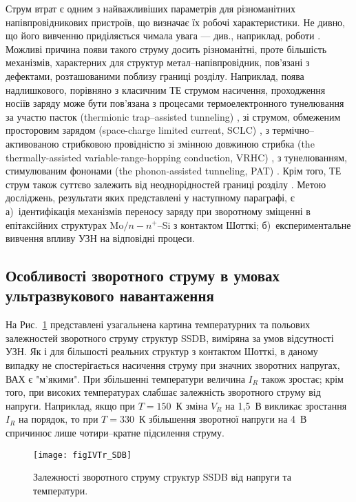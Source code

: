 Струм втрат є одним з найважливіших параметрів для різноманітних напівпровідникових пристроїв, що визначає їх робочі характеристики.
Не дивно, що його вивченню приділяється чимала увага --- див., наприклад, роботи \cite{Sathaiya,VRH:Shan,Pipinys2006,Referi1,Referi2}.
Можливі причина появи такого струму досить різноманітні, проте більшість механізмів, характерних для структур метал--напівпровідник,
пов'язані з дефектами, розташованими поблизу границі розділу.
Наприклад, поява надлишкового, порівняно з класичним ТЕ струмом насичення, проходження носіїв заряду може
бути пов'язана
з процесами термоелектронного тунелювання за участю пасток (thermionic trap--assisted tunneling) \cite{Sathaiya},
зі струмом, обмеженим просторовим зарядом (space-charge limited current, SCLC) \cite{Abu-Samaha,Jafar},
з термічно--активованою стрибковою провідністю зі змінною довжиною стрибка (the thermally-assisted variable-range-hopping conduction, VRHC) \cite{Jafar,VRH:Lee,VRH:Shan},
з тунелюванням, стимулюваним фононами (the phonon-assisted tunneling, PAT) \cite{Pipinys1999,Pipinys2006}.
Крім того, ТЕ струм також суттєво залежить від неоднорідностей границі розділу  \cite{Tung:MSE}.
Метою досліджень, результати яких представлені у наступному параграфі, є
а)~ідентифікація механізмів переносу заряду при зворотному зміщенні в епітаксійних структурах Mo$/n-n^+$--Si з контактом Шотткі;
б)~експериментальне вивчення впливу УЗН на відповідні процеси.

\subsection{Особливості зворотного струму в умовах ультразвукового навантаження}

На Рис.~\ref{figIVTr_SDB} представлені узагальнена картина температурних та польових залежностей зворотного струму структур SSDB,
виміряна за умов відсутності УЗН.
Як і для більшості реальних структур з контактом Шотткі, в даному випадку не спостерігається насичення струму при
значних зворотних напругах, ВАХ є "м'якими".
При збільшенні температури величина $I_R$ також зростає;
крім того, при високих температурах слабшає залежність зворотного струму від напруги.
Наприклад, якщо при $T=150$~К зміна $V_R$ на 1,5~В викликає зростання $I_R$ на порядок,
то при $T=330$~К збільшення зворотної напруги на 4~В спричинює лише чотири--кратне підсилення струму.

\begin{figure}
\center
\texttt{[image: figIVTr\_SDB]}
\caption{\label{figIVTr_SDB}
Залежності зворотного струму структур SSDB від напруги та температури.
}%
\end{figure}

